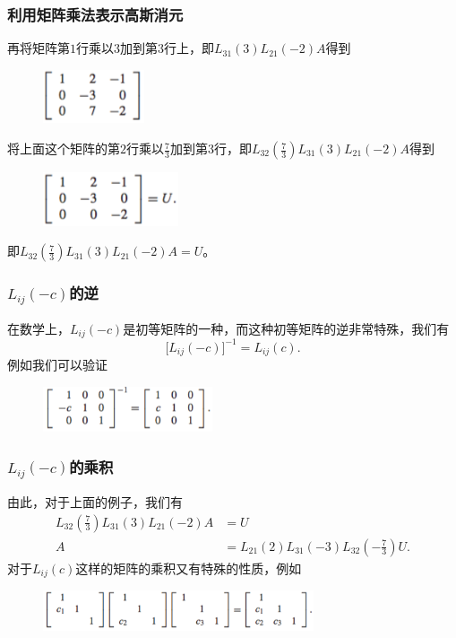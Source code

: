 \documentclass[10pt]{beamer}
\begin{document}
\begin{frame}
\frametitle{利用矩阵乘法表示高斯消元}
再将矩阵第$1$行乘以$3$加到第$3$行上，即$L_{31}(3)L_{21}(-2) A$得到
\begin{figure}
\includegraphics[width=3cm]{figs/2_2_LU-4} 
\end{figure}
将上面这个矩阵的第$2$行乘以$\frac{7}{3}$加到第$3$行，即$L_{32}(\frac{7}{3})L_{31}(3)L_{21}(-2) A$得到
\begin{figure}
\includegraphics[width=4cm]{figs/2_2_LU-5} 
\end{figure}
即$L_{32}(\frac{7}{3})L_{31}(3)L_{21}(-2) A = U$。
\end{frame}


\begin{frame}
\frametitle{$L_{ij}(-c)$的逆}
在数学上，$L_{ij}(-c)$是初等矩阵的一种，而这种初等矩阵的逆非常特殊，我们有
\begin{equation}
\big[L_{ij}(-c) \big]^{-1} = L_{ij}(c) .
\end{equation}
例如我们可以验证
\begin{figure}
\includegraphics[width=5cm]{figs/2_2_LU-6} 
\end{figure}
\end{frame}


\begin{frame}
\frametitle{$L_{ij}(-c)$的乘积}
由此，对于上面的例子，我们有
\begin{align}
L_{32}(\frac{7}{3})L_{31}(3)L_{21}(-2) A &= U \nonumber \\
A &= L_{21}(2)L_{31}(-3)L_{32}(-\frac{7}{3})U.
\end{align}
对于$L_{ij}(c)$这样的矩阵的乘积又有特殊的性质，例如
\begin{figure}
\includegraphics[width=8cm]{figs/2_2_LU-7} 
\end{figure}
\end{frame}
\end{document}
